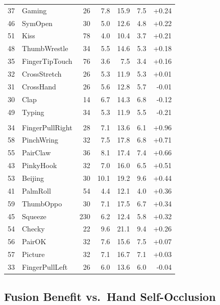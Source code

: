 \documentclass[letterpaper]{article} %
\begin{document}
\begin{table}[t]
\begin{minipage}[t]{0.48\textwidth}
\begin{tabular}{rlrrrrr}
37 & Gaming          & 26  & 7.8 & 15.9 & 7.5 & +0.24 \\
46 & SymOpen         & 30  & 5.0 & 12.6 & 4.8 & +0.22 \\
51 & Kiss            & 78  & 4.0 & 10.4 & 3.7 & +0.21 \\
48 & ThumbWrestle    & 34  & 5.5 & 14.6 & 5.3 & +0.18 \\
35 & FingerTipTouch  & 76  & 3.6 & 7.5  & 3.4 & +0.16 \\
32 & CrossStretch    & 26  & 5.3 & 11.9 & 5.3 & +0.01 \\
31 & CrossHand       & 26  & 5.6 & 12.8 & 5.7 & -0.01 \\
30 & Clap            & 14  & 6.7 & 14.3 & 6.8 & -0.12 \\
49 & Typing          & 34  & 5.3 & 11.9 & 5.5 & -0.21 \\
\addlinespace[3pt]
\multicolumn{7}{l}{\textit{Asymmetric bimanual gestures}} \\
34 & FingerPullRight & 28  & 7.1 & 13.6 & 6.1 & +0.96 \\
58 & PinchWring      & 32  & 7.5 & 17.8 & 6.8 & +0.71 \\
55 & PairClaw        & 36  & 8.1 & 17.4 & 7.4 & +0.66 \\
43 & PinkyHook       & 32  & 7.0 & 16.0 & 6.5 & +0.51 \\
53 & Beijing         & 30  & 10.1 & 19.2 & 9.6 & +0.44 \\
41 & PalmRoll        & 54  & 4.4 & 12.1 & 4.0 & +0.36 \\
59 & ThumbOppo       & 30  & 7.1 & 17.5 & 6.7 & +0.34 \\
45 & Squeeze         & 230 & 6.2 & 12.4 & 5.8 & +0.32 \\
54 & Checky          & 22  & 9.6 & 21.1 & 9.4 & +0.26 \\
56 & PairOK          & 32  & 7.6 & 15.6 & 7.5 & +0.07 \\
57 & Picture         & 32  & 7.1 & 16.7 & 7.1 & +0.03 \\
33 & FingerPullLeft  & 26  & 6.0 & 13.6 & 6.0 & -0.04 \\
\bottomrule
\end{tabular}
\end{minipage}
\endgroup
\end{table}

\subsection{Fusion Benefit vs.\ Hand Self-Occlusion}
\label{app:occlusion}
\end{document}
